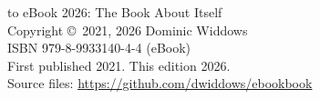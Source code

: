 
\thispagestyle{empty}

\vspace*{\fill}
{\small
\noindent \latex to eBook 2026: The Book About Itself \\   %
Copyright \copyright\ 2021, 2026 Dominic Widdows \\[1ex]  %
ISBN 979-8-9933140-4-4 (eBook) \\[1ex]                    %
First published 2021. This edition 2026. \\
Source files: \url{https://github.com/dwiddows/ebookbook}
\par}

\nextpage
